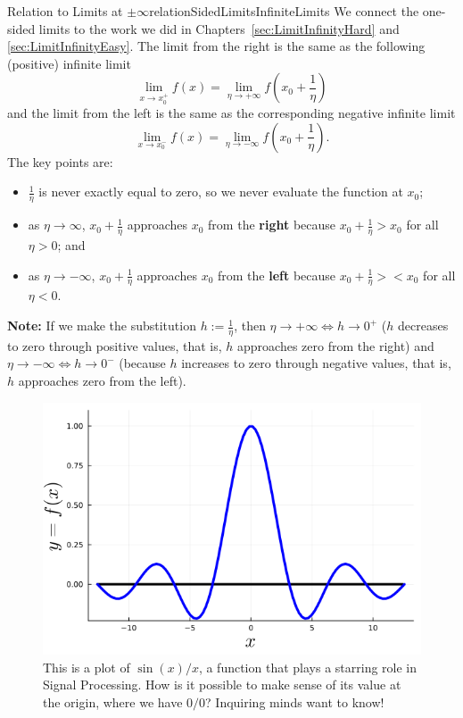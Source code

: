 \begin{factColor}{Relation to Limits at $\pm \infty$}{relationSidedLimitsInfiniteLimits}
   We connect the one-sided limits to the work we did in Chapters~\ref{sec:LimitInfinityHard} and \ref{sec:LimitInfinityEasy}. The limit from the right is the same as the following (positive) infinite limit
    $$ \lim_{x \to x_0^+} f(x) = \lim_{\eta \to + \infty} f(x_0 + \frac{1}{\eta})$$
    and the limit from the left is the same as the corresponding negative infinite limit
    $$ \lim_{x \to x_0^-} f(x) = \lim_{\eta \to -\infty} f(x_0 + \frac{1}{\eta}).$$
    The key points are:
    \begin{itemize}
        \item $\frac{1}{\eta}$ is never exactly equal to zero, so we never evaluate the function at $x_0$;
        \item  as $\eta \to \infty$,  $x_0 + \frac{1}{\eta}$ approaches $x_0$ from the \textbf{right} because $x_0 + \frac{1}{\eta}> x_0$ for all $\eta >0$; and
        \item  as $\eta \to -\infty$,  $x_0 + \frac{1}{\eta}$ approaches $x_0$ from the \textbf{left} because $x_0 + \frac{1}{\eta}><x_0$ for all $\eta <0$.
    \end{itemize}
    
\textbf{Note:} If we make the substitution ${ h:=\frac{1}{\eta} }$, then ${ \eta \to +\infty \iff h \to 0^+ }$ (${h}$ decreases to zero through positive values, that is, ${h}$ approaches zero from the right) and ${ \eta \to -\infty \iff h \to 0^- }$ (because ${h}$ increases to zero through negative values, that is, ${h}$ approaches zero from the left).



\end{factColor}

\begin{figure}[htb]%
\centering
\includegraphics[width=0.6\columnwidth]{graphics/Chap04/sincFunction.png}%
    \caption[]{This is a plot of $\sin(x)/x$, a function that plays a starring role in Signal Processing. How is it possible to make sense of its value at the origin, where we have $0/0$? Inquiring minds want to know!}
    \label{fig:sincFunction}
\end{figure}
\bigskip

